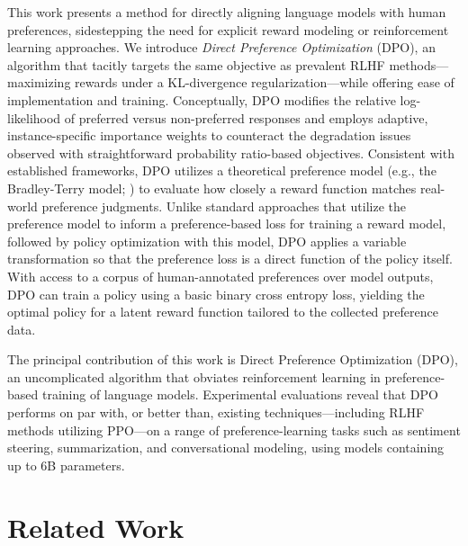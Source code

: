 This work presents a method for directly aligning language models with human preferences, sidestepping the need for explicit reward modeling or reinforcement learning approaches. We introduce \textit{Direct Preference Optimization} (DPO), an algorithm that tacitly targets the same objective as prevalent RLHF methods—maximizing rewards under a KL-divergence regularization—while offering ease of implementation and training. Conceptually, DPO modifies the relative log-likelihood of preferred versus non-preferred responses and employs adaptive, instance-specific importance weights to counteract the degradation issues observed with straightforward probability ratio-based objectives. Consistent with established frameworks, DPO utilizes a theoretical preference model (e.g., the Bradley-Terry model; \cite{bradley1952rankanalysis}) to evaluate how closely a reward function matches real-world preference judgments. Unlike standard approaches that utilize the preference model to inform a preference-based loss for training a reward model, followed by policy optimization with this model, DPO applies a variable transformation so that the preference loss is a direct function of the policy itself. With access to a corpus of human-annotated preferences over model outputs, DPO can train a policy using a basic binary cross entropy loss, yielding the optimal policy for a latent reward function tailored to the collected preference data.

The principal contribution of this work is Direct Preference Optimization (DPO), an uncomplicated algorithm that obviates reinforcement learning in preference-based training of language models. Experimental evaluations reveal that DPO performs on par with, or better than, existing techniques—including RLHF methods utilizing PPO—on a range of preference-learning tasks such as sentiment steering, summarization, and conversational modeling, using models containing up to 6B parameters.

\section{Related Work}

